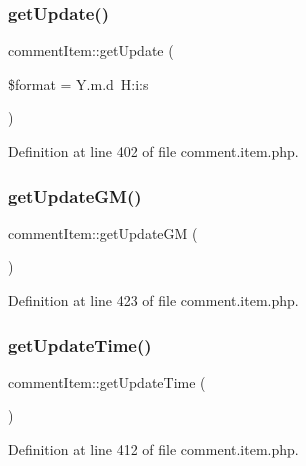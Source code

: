 \subsubsection{\texorpdfstring{get\+Update()}{getUpdate()}}
{\footnotesize\ttfamily comment\+Item\+::get\+Update (\begin{DoxyParamCaption}\item[{}]{\$format = {\ttfamily \textquotesingle{}Y.m.d~H\+:i\+:s\textquotesingle{}} }\end{DoxyParamCaption})}



Definition at line 402 of file comment.\+item.\+php.

\hypertarget{classcommentItem_aab0135e2edd37a47cc390da9b4c79dfa}{}\label{classcommentItem_aab0135e2edd37a47cc390da9b4c79dfa} 
\subsubsection{\texorpdfstring{get\+Update\+G\+M()}{getUpdateGM()}}
{\footnotesize\ttfamily comment\+Item\+::get\+Update\+GM (\begin{DoxyParamCaption}{ }\end{DoxyParamCaption})}



Definition at line 423 of file comment.\+item.\+php.

\hypertarget{classcommentItem_a59d0264c1b6842c6a0dfa21a6dfe1edb}{}\label{classcommentItem_a59d0264c1b6842c6a0dfa21a6dfe1edb} 
\subsubsection{\texorpdfstring{get\+Update\+Time()}{getUpdateTime()}}
{\footnotesize\ttfamily comment\+Item\+::get\+Update\+Time (\begin{DoxyParamCaption}{ }\end{DoxyParamCaption})}



Definition at line 412 of file comment.\+item.\+php.

\hypertarget{classcommentItem_aaa9c1ef5cfd0ce69fd83d8d980360ee5}{}\label{classcommentItem_aaa9c1ef5cfd0ce69fd83d8d980360ee5} 
